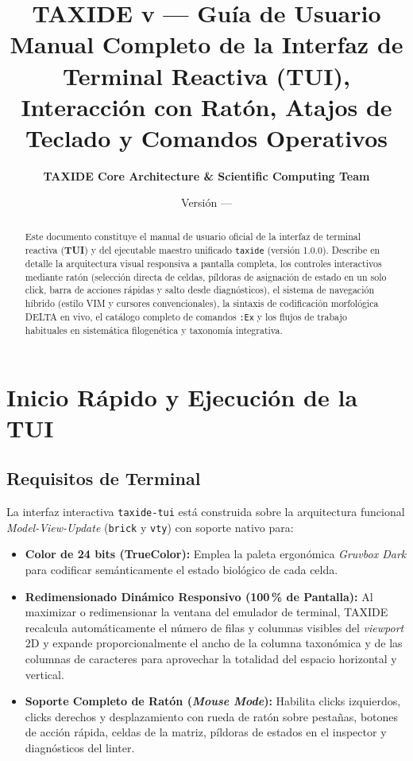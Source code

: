 \documentclass[11pt,a4paper]{article}
\title{\textbf{\Huge TAXIDE v\taxideversion{} --- Guía de Usuario}\\
\Large Manual Completo de la Interfaz de Terminal Reactiva (TUI),\\
Interacción con Ratón, Atajos de Teclado y Comandos Operativos}
\author{\textbf{TAXIDE Core Architecture \& Scientific Computing Team}}
\date{Versión \taxideversion{} --- \taxidedate}
\newcommand{\taxideversion}{1.0.0}
\begin{document}
\maketitle

\begin{abstract}
Este documento constituye el manual de usuario oficial de la interfaz de terminal reactiva (\textbf{TUI}) y del ejecutable maestro unificado \texttt{taxide} (versión \taxideversion). Describe en detalle la arquitectura visual responsiva a pantalla completa, los controles interactivos mediante ratón (selección directa de celdas, píldoras de asignación de estado en un solo click, barra de acciones rápidas y salto desde diagnósticos), el sistema de navegación híbrido (estilo VIM y cursores convencionales), la sintaxis de codificación morfológica DELTA en vivo, el catálogo completo de comandos \texttt{:Ex} y los flujos de trabajo habituales en sistemática filogenética y taxonomía integrativa.
\end{abstract}

\tableofcontents
\newpage

\section{Inicio Rápido y Ejecución de la TUI}
\label{sec:inicio}

\subsection{Requisitos de Terminal}
La interfaz interactiva \texttt{taxide-tui} está construida sobre la arquitectura funcional \textit{Model-View-Update} (\texttt{brick} y \texttt{vty}) con soporte nativo para:
\begin{itemize}
    \item \textbf{Color de 24 bits (TrueColor):} Emplea la paleta ergonómica \textit{Gruvbox Dark} para codificar semánticamente el estado biológico de cada celda.
    \item \textbf{Redimensionado Dinámico Responsivo (100\,\% de Pantalla):} Al maximizar o redimensionar la ventana del emulador de terminal, TAXIDE recalcula automáticamente el número de filas y columnas visibles del \textit{viewport} 2D y expande proporcionalmente el ancho de la columna taxonómica y de las columnas de caracteres para aprovechar la totalidad del espacio horizontal y vertical.
    \item \textbf{Soporte Completo de Ratón (\textit{Mouse Mode}):} Habilita clicks izquierdos, clicks derechos y desplazamiento con rueda de ratón sobre pestañas, botones de acción rápida, celdas de la matriz, píldoras de estados en el inspector y diagnósticos del linter.
\end{itemize}
\end{document}
